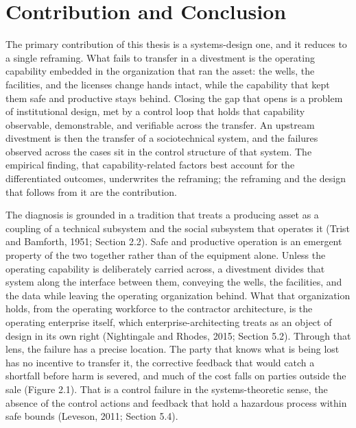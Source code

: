 \hypertarget{contribution-and-conclusion}{%
\section{Contribution and
Conclusion}\label{contribution-and-conclusion}}

The primary contribution of this thesis is a systems-design one, and it
reduces to a single reframing. What fails to transfer in a divestment is
the operating capability embedded in the organization that ran the
asset: the wells, the facilities, and the licenses change hands intact,
while the capability that kept them safe and productive stays behind.
Closing the gap that opens is a problem of institutional design, met by
a control loop that holds that capability observable, demonstrable, and
verifiable across the transfer. An upstream divestment is then the
transfer of a sociotechnical system, and the failures observed across
the cases sit in the control structure of that system. The empirical
finding, that capability-related factors best account for the
differentiated outcomes, underwrites the reframing; the reframing and
the design that follows from it are the contribution.

The diagnosis is grounded in a tradition that treats a producing asset
as a coupling of a technical subsystem and the social subsystem that
operates it (Trist and Bamforth, 1951; Section 2.2). Safe and productive
operation is an emergent property of the two together rather than of the
equipment alone. Unless the operating capability is deliberately carried
across, a divestment divides that system along the interface between
them, conveying the wells, the facilities, and the data while leaving
the operating organization behind. What that organization holds, from
the operating workforce to the contractor architecture, is the operating
enterprise itself, which enterprise-architecting treats as an object of
design in its own right (Nightingale and Rhodes, 2015; Section 5.2).
Through that lens, the failure has a precise location. The party that
knows what is being lost has no incentive to transfer it, the corrective
feedback that would catch a shortfall before harm is severed, and much
of the cost falls on parties outside the sale (Figure 2.1). That is a
control failure in the systems-theoretic sense, the absence of the
control actions and feedback that hold a hazardous process within safe
bounds (Leveson, 2011; Section 5.4).

